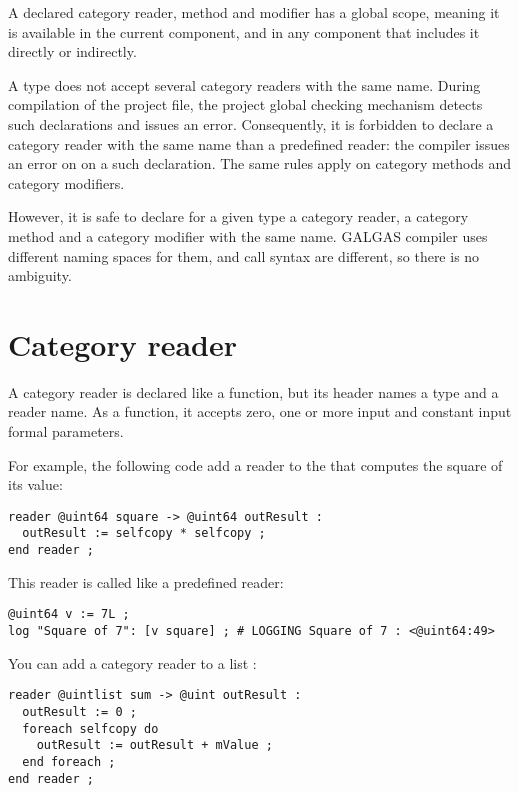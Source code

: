 A declared category reader, method and modifier has a global scope, meaning it is available in the current component, and in any component that includes it directly or indirectly.

A type does not accept several category readers with the same name. During compilation of the project file, the project global checking mechanism detects such declarations and issues an error. Consequently, it is forbidden to declare a category reader with the same name than a predefined reader: the compiler issues an error on on a such declaration. The same rules apply on category methods and category modifiers.

However, it is safe to declare for a given type a category reader, a category method and a category modifier with the same name. GALGAS compiler uses different naming spaces for them, and call syntax are different, so there is no ambiguity.










\section{Category reader}

A category reader is declared like a function, but its header names a type and a reader name. As a function, it accepts zero, one or more input and constant input formal parameters.

For example, the following code add a reader to the  that computes the square of its value:
\begin{lstlisting}[language=galgas]
reader @uint64 square -> @uint64 outResult :
  outResult := selfcopy * selfcopy ;
end reader ;
\end{lstlisting}

This reader is called like a predefined reader:
\begin{lstlisting}[language=galgas]
@uint64 v := 7L ;
log "Square of 7": [v square] ; # LOGGING Square of 7 : <@uint64:49>
\end{lstlisting}

You can add a category reader to a list :
\begin{lstlisting}[language=galgas]
reader @uintlist sum -> @uint outResult :
  outResult := 0 ;
  foreach selfcopy do
    outResult := outResult + mValue ;
  end foreach ;
end reader ;
\end{lstlisting}

